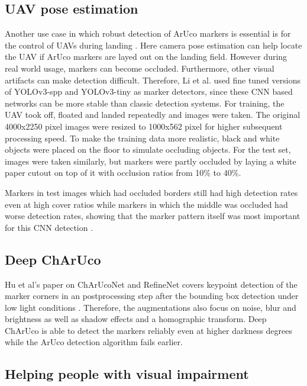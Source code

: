 \documentclass[10pt]{book}
\begin{document}
\subsection{UAV pose estimation}

Another use case in which robust detection of \ac{ArUco} markers is essential is for the control of \acp{UAV} during landing \cite{li2020aruco}. Here camera pose estimation can help locate the \ac{UAV} if \ac{ArUco} markers are layed out on the landing field. However during real world usage, markers can become occluded. Furthermore, other visual artifacts can make detection difficult. Therefore, Li et al. used fine tuned versions of \ac{YOLO}v3-spp and \ac{YOLO}v3-tiny as marker detectors, since these \ac{CNN} based networks can be more stable than classic detection systems. For training, the \ac{UAV} took off, floated and landed repeatedly and images were taken. The original 4000x2250 pixel images were resized to 1000x562 pixel for higher subsequent processing speed. To make the training data more realistic, black and white objects were placed on the floor to simulate occluding objects. For the test set, images were taken similarly, but markers were partly occluded by laying a white paper cutout on top of it with occlusion ratios from 10\% to 40\%. 

Markers in test images which had occluded borders still had high detection rates even at high cover ratios while markers in which the middle was occluded had worse detection rates, showing that the marker pattern itself was most important for this \ac{CNN} detection \cite{li2020aruco}.

\subsection{Deep ChArUco}

Hu et al's paper on ChArUcoNet and RefineNet covers keypoint detection of the marker corners in an postprocessing step after the bounding box detection under low light conditions \cite{hu2019deep}. Therefore, the augmentations also focus on noise, blur and brightness as well as shadow effects and a homographic transform. Deep ChArUco is able to detect the markers reliably even at higher darkness degrees while the \ac{ArUco} detection algorithm fails earlier. 

\subsection{Helping people with visual impairment}
\end{document}
